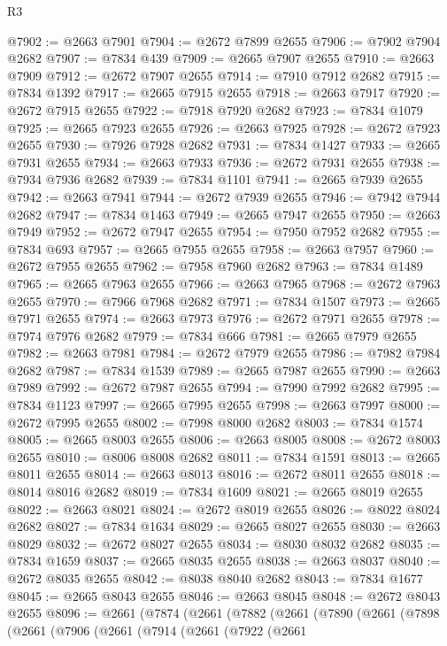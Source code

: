 \begin{lexlean}{R3}
\begin{coremodule}
@7902 := @2663 @7901
@7904 := @2672 @7899 @2655
@7906 := @7902 @7904 @2682
@7907 := @7834 @439
@7909 := @2665 @7907 @2655
@7910 := @2663 @7909
@7912 := @2672 @7907 @2655
@7914 := @7910 @7912 @2682
@7915 := @7834 @1392
@7917 := @2665 @7915 @2655
@7918 := @2663 @7917
@7920 := @2672 @7915 @2655
@7922 := @7918 @7920 @2682
@7923 := @7834 @1079
@7925 := @2665 @7923 @2655
@7926 := @2663 @7925
@7928 := @2672 @7923 @2655
@7930 := @7926 @7928 @2682
@7931 := @7834 @1427
@7933 := @2665 @7931 @2655
@7934 := @2663 @7933
@7936 := @2672 @7931 @2655
@7938 := @7934 @7936 @2682
@7939 := @7834 @1101
@7941 := @2665 @7939 @2655
@7942 := @2663 @7941
@7944 := @2672 @7939 @2655
@7946 := @7942 @7944 @2682
@7947 := @7834 @1463
@7949 := @2665 @7947 @2655
@7950 := @2663 @7949
@7952 := @2672 @7947 @2655
@7954 := @7950 @7952 @2682
@7955 := @7834 @693
@7957 := @2665 @7955 @2655
@7958 := @2663 @7957
@7960 := @2672 @7955 @2655
@7962 := @7958 @7960 @2682
@7963 := @7834 @1489
@7965 := @2665 @7963 @2655
@7966 := @2663 @7965
@7968 := @2672 @7963 @2655
@7970 := @7966 @7968 @2682
@7971 := @7834 @1507
@7973 := @2665 @7971 @2655
@7974 := @2663 @7973
@7976 := @2672 @7971 @2655
@7978 := @7974 @7976 @2682
@7979 := @7834 @666
@7981 := @2665 @7979 @2655
@7982 := @2663 @7981
@7984 := @2672 @7979 @2655
@7986 := @7982 @7984 @2682
@7987 := @7834 @1539
@7989 := @2665 @7987 @2655
@7990 := @2663 @7989
@7992 := @2672 @7987 @2655
@7994 := @7990 @7992 @2682
@7995 := @7834 @1123
@7997 := @2665 @7995 @2655
@7998 := @2663 @7997
@8000 := @2672 @7995 @2655
@8002 := @7998 @8000 @2682
@8003 := @7834 @1574
@8005 := @2665 @8003 @2655
@8006 := @2663 @8005
@8008 := @2672 @8003 @2655
@8010 := @8006 @8008 @2682
@8011 := @7834 @1591
@8013 := @2665 @8011 @2655
@8014 := @2663 @8013
@8016 := @2672 @8011 @2655
@8018 := @8014 @8016 @2682
@8019 := @7834 @1609
@8021 := @2665 @8019 @2655
@8022 := @2663 @8021
@8024 := @2672 @8019 @2655
@8026 := @8022 @8024 @2682
@8027 := @7834 @1634
@8029 := @2665 @8027 @2655
@8030 := @2663 @8029
@8032 := @2672 @8027 @2655
@8034 := @8030 @8032 @2682
@8035 := @7834 @1659
@8037 := @2665 @8035 @2655
@8038 := @2663 @8037
@8040 := @2672 @8035 @2655
@8042 := @8038 @8040 @2682
@8043 := @7834 @1677
@8045 := @2665 @8043 @2655
@8046 := @2663 @8045
@8048 := @2672 @8043 @2655
@8096 := @2661
    (@7874
      (@2661
        (@7882
          (@2661
            (@7890
              (@2661
                (@7898
                  (@2661
                    (@7906
                      (@2661
                        (@7914
                          (@2661
                            (@7922
                              (@2661

\end{coremodule}
\end{lexlean}
